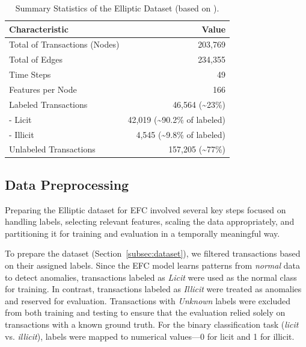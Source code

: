 \documentclass[12pt]{article}
\begin{document}
\begin{table}[htbp]
  \centering
  \caption{Summary Statistics of the Elliptic Dataset (based on \cite{weber2019antimoneylaunderingbitcoinexperimenting}).}
  \label{tab:dataset_summary}
  \begin{small}
  \begin{tabular}{lr}\toprule
    Characteristic        & Value \\ \midrule
    Total of Transactions (Nodes) & 203,769 \\
    Total of Edges           & 234,355 \\
    Time Steps            & 49 \\
    Features per Node     & 166 \\
    Labeled Transactions  & 46,564 (\textasciitilde23\%) \\
    \quad - Licit         & 42,019 (\textasciitilde90.2\% of labeled) \\
    \quad - Illicit       & 4,545 (\textasciitilde9.8\% of labeled) \\
    Unlabeled Transactions & 157,205 (\textasciitilde77\%) \\ \bottomrule
  \end{tabular}
  \end{small}
\end{table}

\subsection{Data Preprocessing} \label{subsec:preprocessing}
Preparing the Elliptic dataset for EFC involved several key steps focused on handling labels, selecting relevant features,
scaling the data appropriately, and partitioning it for training and evaluation in a temporally meaningful way.

To prepare the dataset (Section~\ref{subsec:dataset}), we filtered transactions based on their assigned labels. Since the
EFC model learns patterns from \textit{normal} data to detect anomalies, transactions labeled as \textit{Licit} were used
as the normal class for training. In contrast, transactions labeled as \textit{Illicit} were treated as anomalies and reserved
for evaluation. Transactions with \textit{Unknown} labels were excluded from both training and testing to ensure that the
evaluation relied solely on transactions with a known ground truth. For the binary classification task (\textit{licit} vs.
\textit{illicit}), labels were mapped to numerical values—0 for licit and 1 for illicit.
\end{document}
